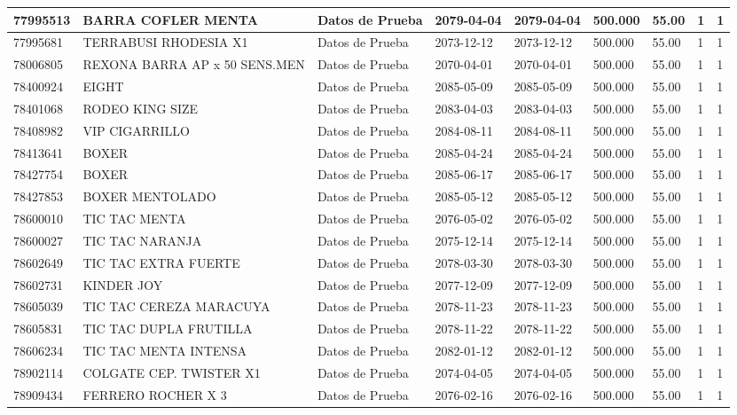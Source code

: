 \documentclass[a4paper,12pt]{article}
\begin{document}
\begin{landscape}
\begin{longtable}{|p{4cm}|p{2.5cm}|p{2.5cm}|p{1.8cm}|p{1.8cm}|p{1cm}|p{1cm}|p{3cm}|p{3cm}||}
77995513 & BARRA COFLER MENTA & Datos de Prueba & 2079-04-04 & 2079-04-04 & 500.000 & 55.00 & 1 & 1 \\ \hline 
77995681 & TERRABUSI RHODESIA X1 & Datos de Prueba & 2073-12-12 & 2073-12-12 & 500.000 & 55.00 & 1 & 1 \\ \hline 
78006805 & REXONA BARRA AP x 50 SENS.MEN & Datos de Prueba & 2070-04-01 & 2070-04-01 & 500.000 & 55.00 & 1 & 1 \\ \hline 
78400924 & EIGHT & Datos de Prueba & 2085-05-09 & 2085-05-09 & 500.000 & 55.00 & 1 & 1 \\ \hline 
78401068 & RODEO KING SIZE & Datos de Prueba & 2083-04-03 & 2083-04-03 & 500.000 & 55.00 & 1 & 1 \\ \hline 
78408982 & VIP CIGARRILLO & Datos de Prueba & 2084-08-11 & 2084-08-11 & 500.000 & 55.00 & 1 & 1 \\ \hline 
78413641 & BOXER & Datos de Prueba & 2085-04-24 & 2085-04-24 & 500.000 & 55.00 & 1 & 1 \\ \hline 
78427754 & BOXER & Datos de Prueba & 2085-06-17 & 2085-06-17 & 500.000 & 55.00 & 1 & 1 \\ \hline 
78427853 & BOXER  MENTOLADO & Datos de Prueba & 2085-05-12 & 2085-05-12 & 500.000 & 55.00 & 1 & 1 \\ \hline 
78600010 & TIC TAC  MENTA & Datos de Prueba & 2076-05-02 & 2076-05-02 & 500.000 & 55.00 & 1 & 1 \\ \hline 
78600027 & TIC TAC NARANJA & Datos de Prueba & 2075-12-14 & 2075-12-14 & 500.000 & 55.00 & 1 & 1 \\ \hline 
78602649 & TIC TAC EXTRA FUERTE & Datos de Prueba & 2078-03-30 & 2078-03-30 & 500.000 & 55.00 & 1 & 1 \\ \hline 
78602731 & KINDER JOY & Datos de Prueba & 2077-12-09 & 2077-12-09 & 500.000 & 55.00 & 1 & 1 \\ \hline 
78605039 & TIC TAC CEREZA MARACUYA & Datos de Prueba & 2078-11-23 & 2078-11-23 & 500.000 & 55.00 & 1 & 1 \\ \hline 
78605831 & TIC TAC DUPLA FRUTILLA & Datos de Prueba & 2078-11-22 & 2078-11-22 & 500.000 & 55.00 & 1 & 1 \\ \hline 
78606234 & TIC TAC MENTA INTENSA & Datos de Prueba & 2082-01-12 & 2082-01-12 & 500.000 & 55.00 & 1 & 1 \\ \hline 
78902114 & COLGATE CEP. TWISTER X1 & Datos de Prueba & 2074-04-05 & 2074-04-05 & 500.000 & 55.00 & 1 & 1 \\ \hline 
78909434 & FERRERO ROCHER X 3 & Datos de Prueba & 2076-02-16 & 2076-02-16 & 500.000 & 55.00 & 1 & 1 \\ \hline 

\end{longtable}
\end{landscape}
\end{document}
